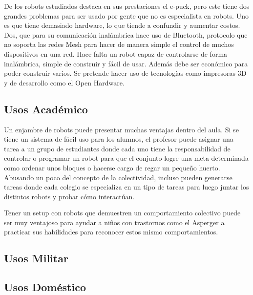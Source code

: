 De los robots estudiados destaca en sus prestaciones el e-puck, pero este tiene dos grandes problemas para ser usado por gente que no es especialista en robots. Uno es que tiene demasiado hardware, lo que tiende a confundir y aumentar costos. Dos, que para su comunicación inalámbrica hace uso de Bluetooth, protocolo que no soporta las redes Mesh para hacer de manera simple el control de muchos dispositivos en una red. Hace falta un robot capaz de controlarse de forma inalámbrica, simple de construir y fácil de usar. Además debe ser económico para poder construir varios. Se pretende hacer uso de tecnologías como impresoras 3D y  de desarrollo como el Open Hardware.



\subsection{Usos Académico}

Un enjambre de robots puede presentar muchas ventajas dentro del aula. Si se tiene un sistema de fácil uso para los alumnos, el profesor puede asignar una tarea a un grupo de estudiantes donde cada uno tiene la responsabilidad de controlar o programar un robot para que el conjunto logre una meta determinada como ordenar unos bloques o hacerse cargo de regar un pequeño huerto. Abusando un poco del concepto de la colectividad, incluso pueden generarse tareas donde cada colegio se especializa en un tipo de tareas para luego juntar los distintos robots y probar cómo interactúan.

Tener un setup con robots que demuestren un comportamiento colectivo puede ser muy ventajoso para ayudar a niños con trastornos como el Asperger a practicar sus habilidades para reconocer estos mismo comportamientos.

\subsection{Usos Militar}

\subsection{Usos Doméstico}

